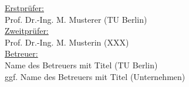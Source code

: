 \begin{titlepage}
   \vfill
   \raggedright
   \small 
   \centering
	\vfill	
	\uline{Erstprüfer:}\vspace{0.25\baselineskip}\\
	Prof. Dr.-Ing. M. Musterer (TU Berlin)\vspace{0.5\baselineskip}\\
	\uline{Zweitprüfer:}\vspace{0.25\baselineskip}\\
	Prof. Dr.-Ing. M. Musterin (XXX)\vspace{2\baselineskip}\\
	\uline{Betreuer:}\vspace{0.25\baselineskip}\\
	Name des Betreuers mit Titel (TU Berlin)\vspace{0.25\baselineskip}\\
	ggf. Name des Betreuers mit Titel (Unternehmen)\\
	

\end{titlepage}
